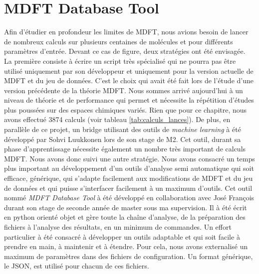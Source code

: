 \section{MDFT Database Tool}
Afin d'étudier en profondeur les limites de MDFT, nous avions besoin de lancer de nombreux calculs sur plusieurs centaines de molécules et pour différents paramètres d'entrée. Devant ce cas de figure, deux stratégies ont été envisagée. La première consiste à écrire un script très spécialisé qui ne pourra pas être utilisé uniquement par son développeur et uniquement pour la version actuelle de MDFT et du jeu de données. C'est le choix qui avait été fait lors de l'étude d'une version précédente de la théorie MDFT\cite{sergiievskyi_fast_2014, sergiievskyi_solvation_2015}. Nous sommes arrivé aujourd'hui à un niveau de théorie et de performance qui permet et nécessite la répétition d'études plus poussées sur des espaces chimiques variés. Rien que pour ce chapitre, nous avons effectué 3874 calculs (voir tableau \ref{tab:calculs_lances}). De plus, en parallèle de ce projet, un bridge utilisant des outils de \textit{machine learning} à été développé par Sohvi Luukkonen lors de son stage de M2. Cet outil, durant sa phase d'apprentissage nécessite également un nombre très important de calculs MDFT. Nous avons donc suivi une autre stratégie. Nous avons consacré un temps plus important au développement d'un outils d'analyse semi automatique qui soit efficace, générique, qui s'adapte facilement aux modifications de MDFT et du jeu de données et qui puisse s'interfacer facilement à un maximum d'outils. Cet outil nommé \textit{MDFT Database Tool} à été développé en collaboration avec José François durant son stage de seconde année de master sous ma supervision. Il à été écrit en python orienté objet et gère toute la chaîne d'analyse, de la préparation des fichiers à l'analyse des résultats, en un minimum de commandes. Un effort particulier à été consacré à développer un outils adaptable et qui soit facile à prendre en main, à maintenir et à étendre. Pour cela, nous avons externalisé un maximum de paramètres dans des fichiers de configuration. Un format générique, le JSON, est utilisé pour chacun de ces fichiers.




